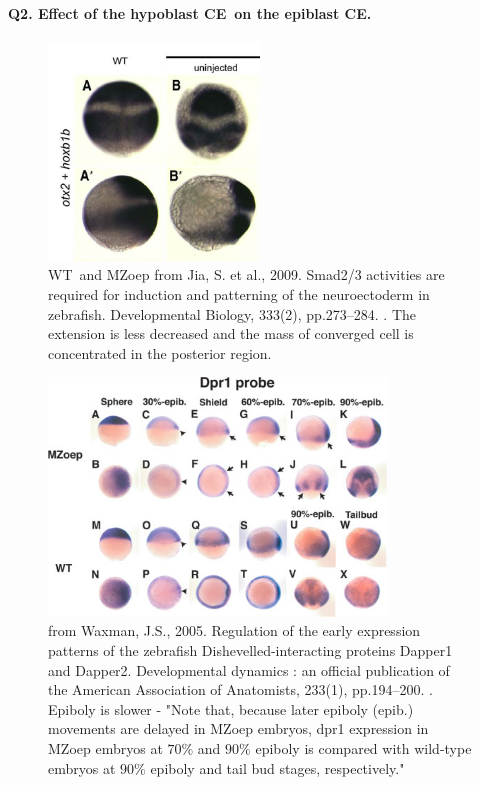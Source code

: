 \paragraph{Q2. Effect of the hypoblast CE on the epiblast CE.}
\begin{figure}
\begin{center}
\includegraphics[width=0.5\textwidth]{../../images/Cases_Studies/Case_7_Convergence_extension/jia_2009.png}
\end{center}
\caption{WT and MZoep from Jia, S. et al., 2009. Smad2/3 activities are required for induction and patterning of the neuroectoderm in zebrafish. Developmental Biology, 333(2), pp.273–284. \cite{Jia:2009ez}. The extension is less decreased and the mass of converged cell is concentrated in the posterior region.}
\label{Case_7_Convergence_extension/jia_2009}
\end{figure}
\begin{figure}
\begin{center}
\includegraphics[width=0.8\textwidth]{../../images/Cases_Studies/Case_7_Convergence_extension/waxman_2005.png}
\end{center}
\caption{from Waxman, J.S., 2005. Regulation of the early expression patterns of the zebrafish Dishevelled-interacting proteins Dapper1 and Dapper2. Developmental dynamics : an official publication of the American Association of Anatomists, 233(1), pp.194–200. \cite{Waxman:2005fe}. Epiboly is slower - "Note that, because later epiboly (epib.) movements are delayed in MZoep embryos, dpr1 expression in MZoep embryos at $70\%$ and $90\%$ epiboly is compared with wild-type embryos at $90\%$ epiboly and tail bud stages, respectively."}
\label{Case_7_Convergence_extension/waxman_2005}
\end{figure}

